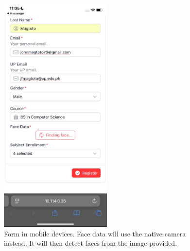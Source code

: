 \begin{figure}[h] %
	\centering
	\includegraphics[width=0.5\textwidth]{figures/chapter4/student_form_mobile.jpg} %
	\caption{Form in mobile devices. Face data will use the native camera instead. It will then detect faces from the image provided.}
	\label{fig:student_form_mobile}
\end{figure}
\clearpage
